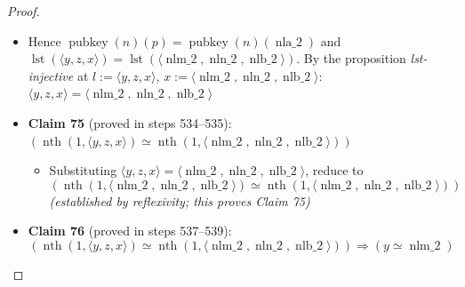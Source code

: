 \documentclass[11pt]{article}
\theoremstyle{plain}
\begin{document}
\begin{proof}
\begin{itemize}[leftmargin=2.8em, itemsep=4pt, parsep=1pt]
\begin{itemize}[leftmargin=2.8em, itemsep=4pt, parsep=1pt]
  \item[\textbf{531--532}] Hence $\operatorname{pubkey}(n)(p) = \operatorname{pubkey}(n)(\operatorname{nla\_2})$ and $\operatorname{lst}(\langle y, z, x \rangle) = \operatorname{lst}(\langle \operatorname{nlm\_2}, \operatorname{nln\_2}, \operatorname{nlb\_2} \rangle)$. By the proposition \emph{lst-injective} at $l := \langle y, z, x \rangle$, $x := \langle \operatorname{nlm\_2}, \operatorname{nln\_2}, \operatorname{nlb\_2} \rangle$: $\langle y, z, x \rangle = \langle \operatorname{nlm\_2}, \operatorname{nln\_2}, \operatorname{nlb\_2} \rangle$
  \item[\textbf{533}] \textbf{Claim 75} (proved in steps 534--535): $(\operatorname{nth}(1, \langle y, z, x \rangle) \simeq \operatorname{nth}(1, \langle \operatorname{nlm\_2}, \operatorname{nln\_2}, \operatorname{nlb\_2} \rangle))$
  \begin{itemize}[leftmargin=2.8em, itemsep=4pt, parsep=1pt]
  \item[\textbf{534--535}] Substituting $\langle y, z, x \rangle = \langle \operatorname{nlm\_2}, \operatorname{nln\_2}, \operatorname{nlb\_2} \rangle$, reduce to
\begin{equation*}
(\operatorname{nth}(1, \langle \operatorname{nlm\_2}, \operatorname{nln\_2}, \operatorname{nlb\_2} \rangle) \simeq \operatorname{nth}(1, \langle \operatorname{nlm\_2}, \operatorname{nln\_2}, \operatorname{nlb\_2} \rangle))
\end{equation*}
  \emph{(established by reflexivity; this proves Claim 75)}
  \end{itemize}
  \item[\textbf{536}] \textbf{Claim 76} (proved in steps 537--539):
\begin{equation*}
(\operatorname{nth}(1, \langle y, z, x \rangle) \simeq \operatorname{nth}(1, \langle \operatorname{nlm\_2}, \operatorname{nln\_2}, \operatorname{nlb\_2} \rangle)) \Rightarrow (y \simeq \operatorname{nlm\_2})
\end{equation*}


\end{itemize}
\end{itemize}
\end{proof}
\end{document}
